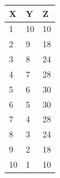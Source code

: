 \documentclass[11pt,a4paper]{article}
\begin{document}
\begin{table}[h]
\begin{tabular}{|l|l|l|}
\hline
X & Y & Z \\ \hline
1 & 10 & 10 \\ \hline
2 & 9 & 18 \\ \hline
3 & 8 & 24 \\ \hline
4 & 7 & 28 \\ \hline
5 & 6 & 30 \\ \hline
6 & 5 & 30 \\ \hline
7 & 4 & 28 \\ \hline
8 & 3 & 24 \\ \hline
9 & 2 & 18 \\ \hline
10 & 1 & 10 \\ \hline
\end{tabular}
\end{table}
\end{document}

